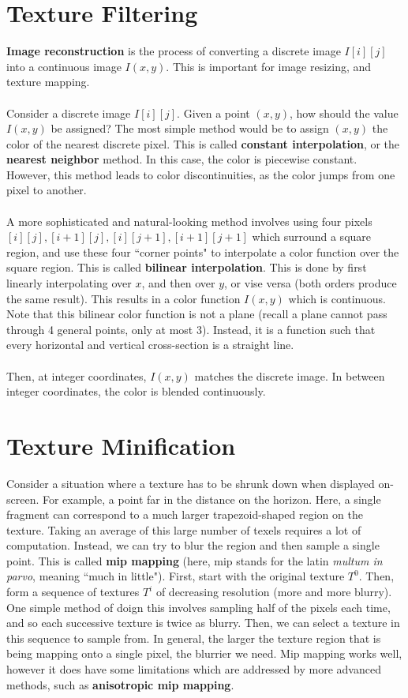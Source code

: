 \documentclass[letterpaper,12pt]{article}
\begin{document}
\section*{Texture Filtering}

\textbf{Image reconstruction} is the process of converting a discrete image $I[i][j]$ into a continuous image $I(x,y)$. This is important for image resizing, and texture mapping.
\\ \\ Consider a discrete image $I[i][j]$. Given a point $(x,y)$, how should the value $I(x,y)$ be assigned? The most simple method would be to assign $(x,y)$ the color of the nearest discrete pixel. This is called \textbf{constant interpolation}, or the \textbf{nearest neighbor} method. In this case, the color is piecewise constant. However, this method leads to color discontinuities, as the color jumps from one pixel to another.
\\ \\ A more sophisticated and natural-looking method involves using four pixels $[i][j], [i+1][j], [i][j+1], [i+1][j+1]$ which surround a square region, and use these four ``corner points" to interpolate a color function over the square region. This is called \textbf{bilinear interpolation}. This is done by first linearly interpolating over $x$, and then over $y$, or vise versa (both orders produce the same result). This results in a color function $I(x,y)$ which is continuous. Note that this bilinear color function is not a plane (recall a plane cannot pass through 4 general points, only at most 3). Instead, it is a function such that every horizontal and vertical cross-section is a straight line.
\\ \\ Then, at integer coordinates, $I(x,y)$ matches the discrete image. In between integer coordinates, the color is blended continuously.

\section*{Texture Minification}
Consider a situation where a texture has to be shrunk down when displayed on-screen. For example, a point far in the distance on the horizon. Here, a single fragment can correspond to a much larger trapezoid-shaped region on the texture. Taking an average of this large number of texels requires a lot of computation. Instead, we can try to blur the region and then sample a single point. This is called \textbf{mip mapping} (here, mip stands for the latin \textit{multum in parvo}, meaning ``much in little"). First, start with the original texture $T^0$. Then, form a sequence of textures $T^i$ of decreasing resolution (more and more blurry). One simple method of doign this involves sampling half of the pixels each time, and so each successive texture is twice as blurry. Then, we can select a texture in this sequence to sample from. In general, the larger the texture region that is being mapping onto a single pixel, the blurrier we need. Mip mapping works well, however it does have some limitations which are addressed by more advanced methods, such as \textbf{anisotropic mip mapping}.
\end{document}
